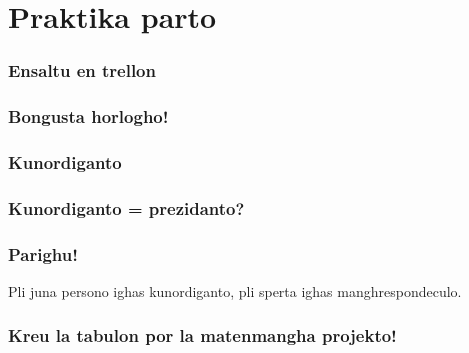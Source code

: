 \documentclass{beamer}
\begin{document}
\section{Praktika parto}
  \begin{frame}
    \frametitle{Ensaltu en trellon}
    
  \end{frame}


  \begin{frame}
    \frametitle{Bongusta horlogho!}
  \end{frame}


  \begin{frame}
    \frametitle{Kunordiganto}
    
  \end{frame}


  \begin{frame}
    \frametitle{Kunordiganto = prezidanto?}
    
  \end{frame}
  
  \begin{frame}
    \frametitle{Parighu!}
    Pli juna persono ighas kunordiganto, pli sperta ighas manghrespondeculo.
  \end{frame}

  \begin{frame}
    \frametitle{Kreu la tabulon por la matenmangha projekto!}
  \end{frame}
\end{document}
